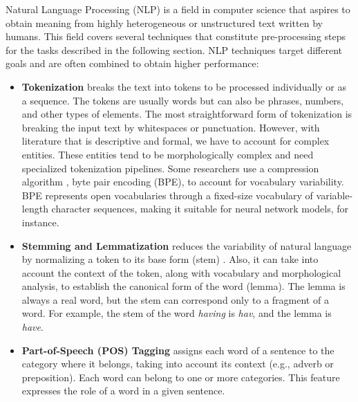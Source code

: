 Natural Language Processing (NLP) is a field in computer science that aspires to obtain meaning from highly heterogeneous or unstructured text written by humans. This field covers several techniques that constitute pre-processing steps for the tasks described in the following section. NLP techniques target different goals and are often combined to obtain higher performance:

\begin{itemize}
    \item \textbf{Tokenization} breaks the text into tokens to be processed individually or as a sequence. The tokens are usually words but can also be phrases, numbers, and other types of elements. The most straightforward form of tokenization is breaking the input text by whitespaces or punctuation. However, with literature that is descriptive and formal, we have to account for complex entities. These entities tend to be morphologically complex and need specialized tokenization pipelines. Some researchers use a compression algorithm \citep{sennrich2015neural}, byte pair encoding (BPE), to account for vocabulary variability. BPE represents open vocabularies through a fixed-size vocabulary of variable-length character sequences, making it suitable for neural network models, for instance.

    \item \textbf{Stemming and Lemmatization} reduces the variability of natural language by normalizing a token to its base form (stem) \citep{manning2008introduction}. Also, it can take into account the context of the token, along with vocabulary and morphological analysis, to establish the canonical form of the word (lemma). The lemma is always a real word, but the stem can correspond only to a fragment of a word. For example, the stem of the word \textit{having} is \textit{hav}, and the lemma is \textit{have}.

    \item \textbf{Part-of-Speech (POS) Tagging} assigns each word of a sentence to the category where it belongs, taking into account its context (e.g., adverb or preposition). Each word can belong to one or more categories. This feature expresses the role of a word in a given sentence. 


\end{itemize}
